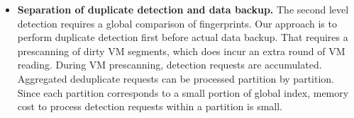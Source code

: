 \begin{itemize}


\item {\bf Separation of duplicate detection and data backup.}
The second level detection requires a global comparison of fingerprints.
Our approach is to perform duplicate detection first before actual data backup.
That requires a prescanning of  dirty VM segments, which
does incur an extra  round of VM reading.
During VM prescanning, detection requests are accumulated.
Aggregated deduplicate requests can be processed partition by partition.
Since each partition corresponds to a small portion of global index,
memory cost to process detection requests within a partition is small.


\end{itemize}
